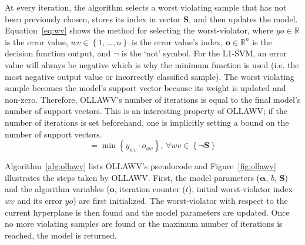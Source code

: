 \documentclass[reqno]{vcuthesis}
\newcommand{\set}[1]{{\left\{#1\right\}}}
\newcommand{\reals}{{\mathbb{R}}}
\numberwithin{equation}{chapter}
\begin{document}
At every iteration, the algorithm selects a worst violating sample that has not been previously chosen, stores its index in vector $\bm S$, and then updates the model. Equation~\ref{eq:wv} shows the method for selecting the worst-violator, where $yo \in \reals$ is the error value, $wv \in \set{1, \ldots, n}$ is the error value's index, $\bm o \in \reals^n$ is the decision function output, and $\neg$ is the `not' symbol. For the L1-SVM, an error value will always be negative which is why the minimum function is used (i.e. the most negative output value or incorrectly classified sample). The worst violating sample becomes the model's support vector because its weight is updated and non-zero. Therefore, OLLAWV's number of iterations is equal to the final model's number of support vectors. This is an interesting property of OLLAWV; if the number of iterations is set beforehand, one is implicitly setting a bound on the number of support vectors. 
\begin{equation}
[yo, wv] = \min \set{y_{wv} \cdot o_{wv}},\, \forall wv \in \set{\neg \bm S}
\label{eq:wv}
\end{equation}

Algorithm~\ref{alg:ollawv} lists OLLAWV's pseudocode and Figure~\ref{fig:ollawv} illustrates the steps taken by OLLAWV. First, the model parameters ($\bm \alpha$, $b$, $\bm S$) and the algorithm variables ($\bm o$, iteration counter ($t$), initial worst-violator index $wv$ and its error $yo$) are first initialized. The worst-violator with respect to the current hyperplane is then found and the model parameters are updated. Once no more violating samples are found or the maximum number of iterations is reached, the model is returned.
\end{document}
